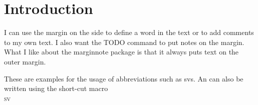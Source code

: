 \chapter{Introduction}


I can use the  margin on the side to define a word in the text or to add comments to
my own text. I also want the TODO command to put notes on the margin. What I
like about the marginnote package is that it always puts text on the outer
margin.

These are examples for the usage of abbreviations such as \acp{sv}. An \sv can also
be written using the short-cut macro \textsc{\\sv}